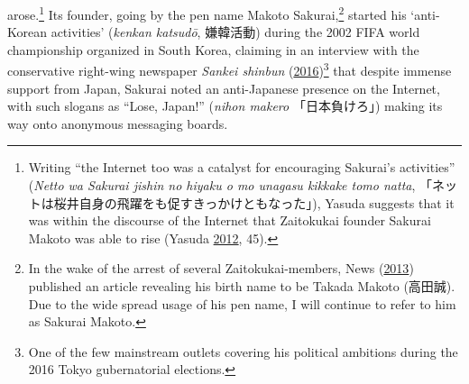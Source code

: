 \documentclass[10pt,british,A4paper,,openany]{memoir}
\begin{document}
arose.\footnote{Writing ``the Internet too was a catalyst for
  encouraging Sakurai's activities'' (\emph{Netto wa Sakurai jishin no
  hiyaku o mo unagasu kikkake tomo natta},
  「ネットは桜井自身の飛躍をも促すきっかけともなった」), Yasuda suggests
  that it was within the discourse of the Internet that Zaitokukai
  founder Sakurai Makoto was able to rise (Yasuda
  \protect\hyperlink{ref-yasuda_eng:_2012}{2012}, 45).} Its founder,
going by the pen name Makoto Sakurai,\footnote{In the wake of the arrest
  of several Zaitokukai-members, News
  (\protect\hyperlink{ref-nikkei_news__2013}{2013}) published an article
  revealing his birth name to be Takada Makoto (高田誠). Due to the wide
  spread usage of his pen name, I will continue to refer to him as
  Sakurai Makoto.} started his `anti-Korean activities' (\emph{kenkan
katsudō}, 嫌韓活動) during the 2002 FIFA world championship organized in
South Korea, claiming in an interview with the conservative right-wing
newspaper \emph{Sankei shinbun}
(\protect\hyperlink{ref-sankei_news__2016}{2016})\footnote{One of the
  few mainstream outlets covering his political ambitions during the
  2016 Tokyo gubernatorial elections.} that despite immense support from
Japan, Sakurai noted an anti-Japanese presence on the Internet, with
such slogans as ``Lose, Japan!'' (\emph{nihon makero} 「日本負けろ」)
making its way onto anonymous messaging boards.
\end{document}
